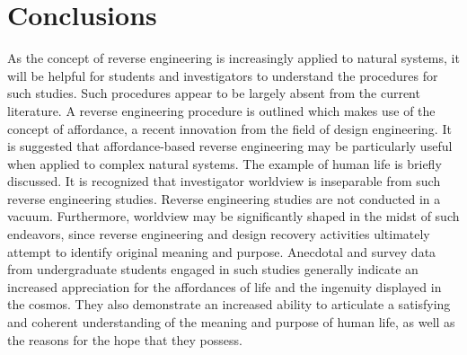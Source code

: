 \section{Conclusions}

As the concept of reverse engineering is increasingly applied to natural
systems, it will be helpful for students and investigators to
understand the procedures for such studies. Such procedures appear to
be largely absent from the current literature. A reverse engineering
procedure is outlined which makes use of the concept of affordance, a
recent innovation from the field of design engineering. It is suggested
that affordance-based reverse engineering may be particularly useful
when applied to complex natural systems. The example of human life is
briefly discussed. It is recognized that investigator worldview is
inseparable from such reverse engineering studies. Reverse engineering
studies are not conducted in a vacuum. 
Furthermore, worldview may be
significantly shaped in the midst of such endeavors, since reverse
engineering and design recovery activities ultimately attempt to
identify original meaning and purpose. Anecdotal and survey data from
undergraduate students engaged in such studies generally indicate an
increased appreciation for the affordances of life and the ingenuity
displayed in the cosmos. They also demonstrate an increased ability to
articulate a satisfying and coherent understanding of the meaning and
purpose of human life, as well as the reasons for the hope that they
possess.

